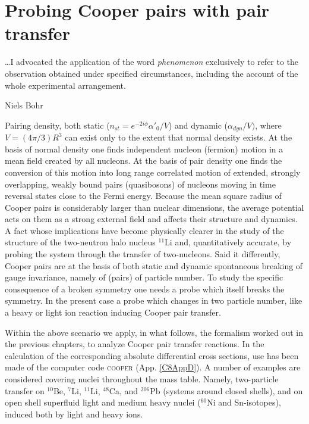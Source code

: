  \chapter{Probing Cooper pairs with pair transfer}\label{C8}
  \epigraph{\dots I advocated the application of the word \textit{phenomenon} exclusively to refer to the observation obtained under specified circumstances, including the account of the whole experimental arrangement.}{Niels Bohr}
Pairing density, both static ($n_{st}=e^{-2i\phi}\alpha'_0/V$) and dynamic ($\alpha_{dyn}/V)$, where $V=(4\pi/3)R^3$ can exist only to the extent that normal density exists. At the basis of normal density one finds independent nucleon (fermion) motion in a mean field created by all nucleons. At the basis of pair density one finds the conversion of this motion into long range correlated motion of extended, strongly overlapping, weakly bound pairs (quasibosons) of nucleons moving in time reversal states close to the Fermi energy. Because the mean square radius of Cooper pairs is considerably larger than nuclear dimensions, the average potential acts on them as a strong external field and affects their structure and dynamics. A fact whose implications have become physically clearer in the study of the structure of the two-neutron  halo nucleus $^{11}$Li and, quantitatively accurate, by probing the system through the transfer of two-nucleons. Said it differently, Cooper pairs are at the basis of both static and dynamic spontaneous breaking of gauge invariance, namely of (pairs) of particle number. To study the specific consequence of a broken symmetry one needs a probe which itself breaks the symmetry. In the present case a probe which changes in two particle number, like a heavy or light ion reaction inducing Cooper pair transfer.

Within the above scenario we apply, in   what follows, the formalism worked out in the previous chapters, to analyze Cooper pair transfer reactions. In the calculation of the corresponding absolute differential cross sections, use has been made of the computer code \textsc{cooper} (App. \ref{C8AppD}).
 A number of examples are considered covering nuclei throughout the mass table. Namely,   two-particle transfer  on $^{10}$Be,    $^{7}$Li, $^{11}$Li, $^{48}$Ca, and $^{206}$Pb (systems around closed shells), and on open shell superfluid light and  medium heavy nuclei ($^{60}$Ni and Sn-isotopes), induced both by light and heavy ions.
